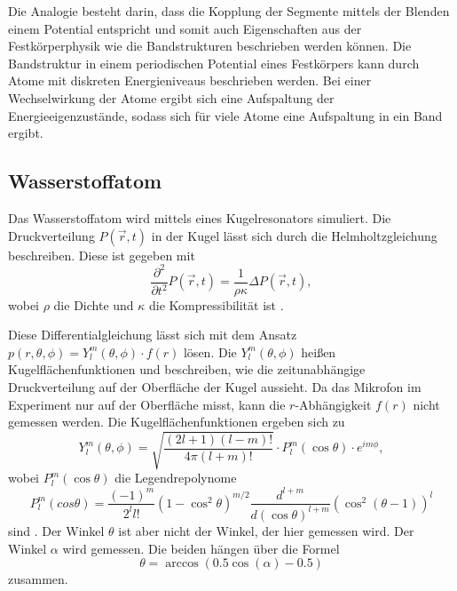 Die Analogie besteht darin, dass die Kopplung der Segmente mittels der Blenden einem Potential entspricht und somit auch Eigenschaften aus der Festkörperphysik wie die Bandstrukturen beschrieben werden können. 
Die Bandstruktur in einem periodischen Potential eines Festkörpers kann durch Atome mit diskreten Energieniveaus beschrieben werden. Bei einer Wechselwirkung der Atome ergibt sich eine Aufspaltung der Energieeigenzustände, sodass sich für viele Atome eine Aufspaltung in ein Band ergibt. \cite{QM2}


\subsection{Wasserstoffatom}
\label{sec:Wasserstoff}
Das Wasserstoffatom wird mittels eines Kugelresonators simuliert. Die Druckverteilung $P(\vec r,t)$ in der Kugel lässt sich durch die Helmholtzgleichung beschreiben. 
Diese ist gegeben mit 
\begin{equation*}
    \frac{\partial^2}{\partial t^2} P(\vec r,t) = \frac{1}{\rho\kappa} \Delta P(\vec r,t),
\end{equation*}
wobei $\rho$ die Dichte und $\kappa$ die Kompressibilität ist \cite{QM1}. 

Diese Differentialgleichung lässt sich mit dem Ansatz $p(r, \theta, \phi) = Y^m_l(\theta, \phi) \cdot f(r)$ lösen.
Die $Y^m_l(\theta, \phi)$ heißen Kugelflächenfunktionen und beschreiben, wie die zeitunabhängige Druckverteilung auf der Oberfläche der Kugel aussieht. 
Da das Mikrofon im Experiment nur auf der Oberfläche misst, kann die $r$-Abhängigkeit $f(r)$ nicht gemessen werden. 
Die Kugelflächenfunktionen ergeben sich zu 
\begin{equation*}
    Y^m_l (\theta, \phi) = \sqrt{\frac{(2l+1)(l-m)!}{4\pi(l+m)!}} \cdot P^m_l(\cos \theta) \cdot e^{i m \phi},
\end{equation*}
wobei $P^m_l(\cos \theta)$ die Legendrepolynome 
\begin{equation*}
P^m_l(cos \theta) = \frac{(-1)^m}{2^l l!} (1- \cos^2 \theta)^{m/2} \frac{d^{l+m}}{d(\cos \theta)^{l+m}} (\cos^2 (\theta -1))^l
\end{equation*}
sind \cite{QM1}.
Der Winkel $\theta$ ist aber nicht der Winkel, der hier gemessen wird. Der Winkel $\alpha$ wird gemessen. 
Die beiden hängen über die Formel 
\begin{equation}
    \theta = \arccos ( 0.5 \cos (\alpha) - 0.5) 
    \label{theta}
\end{equation}
zusammen. 

